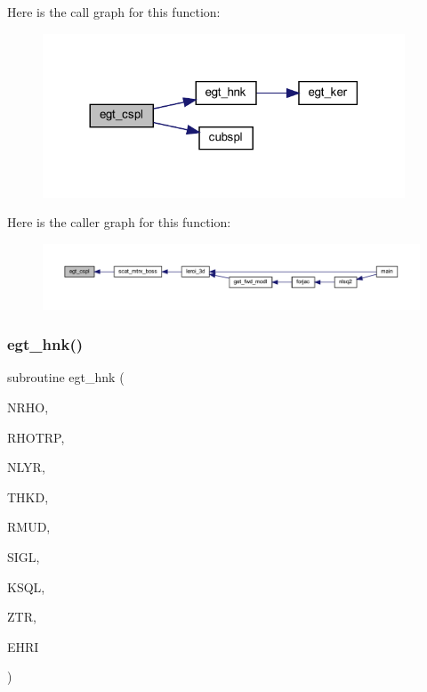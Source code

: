 Here is the call graph for this function\+:\nopagebreak
\begin{figure}[H]
\begin{center}
\leavevmode
\includegraphics[width=305pt]{Leroi_8f90_a39b25039701be699f724d2a872d3d3f3_cgraph}
\end{center}
\end{figure}
Here is the caller graph for this function\+:\nopagebreak
\begin{figure}[H]
\begin{center}
\leavevmode
\includegraphics[width=350pt]{Leroi_8f90_a39b25039701be699f724d2a872d3d3f3_icgraph}
\end{center}
\end{figure}
\mbox{\label{Leroi_8f90_ae50e88569c7037d3d431d0b0dd30c795}} 
\subsubsection{\texorpdfstring{egt\+\_\+hnk()}{egt\_hnk()}}
{\footnotesize\ttfamily subroutine egt\+\_\+hnk (\begin{DoxyParamCaption}\item[{integer}]{N\+R\+HO,  }\item[{real, dimension(nrho)}]{R\+H\+O\+T\+RP,  }\item[{integer}]{N\+L\+YR,  }\item[{real(kind=ql), dimension(nlyr)}]{T\+H\+KD,  }\item[{real(kind=ql), dimension(0\+:nlyr)}]{R\+M\+UD,  }\item[{complex(kind=ql), dimension(nlyr)}]{S\+I\+GL,  }\item[{complex(kind=ql), dimension(nlyr)}]{K\+S\+QL,  }\item[{real}]{Z\+TR,  }\item[{complex(kind=ql), dimension(nrho,6)}]{E\+H\+RI }\end{DoxyParamCaption})}

